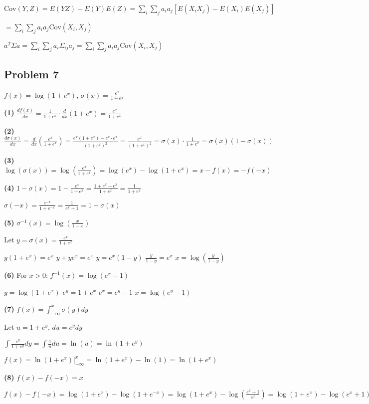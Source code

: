 \documentclass{article}
\begin{document}
$\text{Cov}(Y,Z) = E(YZ) - E(Y)E(Z) = \sum_i \sum_j a_i a_j [E(X_i X_j) - E(X_i)E(X_j)]$

$= \sum_i \sum_j a_i a_j \text{Cov}(X_i, X_j)$

$a^T \Sigma a = \sum_i \sum_j a_i \Sigma_{ij} a_j = \sum_i \sum_j a_i a_j \text{Cov}(X_i, X_j)$

\subsection*{Problem 7}
$f(x) = \log(1 + e^x)$, $\sigma(x) = \frac{e^x}{1 + e^x}$

\textbf{(1)} $\frac{d f(x)}{dx} = \frac{1}{1+e^x} \cdot \frac{d}{dx}(1+e^x) = \frac{e^x}{1+e^x}$

\textbf{(2)} $\frac{d\sigma(x)}{dx} = \frac{d}{dx}\left(\frac{e^x}{1+e^x}\right) = \frac{e^x(1+e^x) - e^x \cdot e^x}{(1+e^x)^2} = \frac{e^x}{(1+e^x)^2} = \sigma(x) \cdot \frac{1}{1+e^x} = \sigma(x)(1-\sigma(x))$

\textbf{(3)} $\log(\sigma(x)) = \log\left(\frac{e^x}{1+e^x}\right) = \log(e^x) - \log(1+e^x) = x - f(x) = -f(-x)$

\textbf{(4)} $1-\sigma(x) = 1 - \frac{e^x}{1+e^x} = \frac{1+e^x-e^x}{1+e^x} = \frac{1}{1+e^x}$

$\sigma(-x) = \frac{e^{-x}}{1+e^{-x}} = \frac{1}{e^x+1} = 1-\sigma(x)$

\textbf{(5)} $\sigma^{-1}(x) = \log\left(\frac{x}{1-x}\right)$

Let $y = \sigma(x) = \frac{e^x}{1+e^x}$

$y(1+e^x) = e^x$
$y + ye^x = e^x$
$y = e^x(1-y)$
$\frac{y}{1-y} = e^x$
$x = \log\left(\frac{y}{1-y}\right)$

\textbf{(6)} For $x > 0$: $f^{-1}(x) = \log(e^x - 1)$

$y = \log(1+e^x)$
$e^y = 1+e^x$
$e^x = e^y - 1$
$x = \log(e^y - 1)$

\textbf{(7)} $f(x) = \int_{-\infty}^x \sigma(y) dy$

Let $u = 1+e^y$, $du = e^y dy$

$\int \frac{e^y}{1+e^y} dy = \int \frac{1}{u} du = \ln(u) = \ln(1+e^y)$

$f(x) = \ln(1+e^x)\Big|_{-\infty}^x = \ln(1+e^x) - \ln(1) = \ln(1+e^x)$

\textbf{(8)} $f(x) - f(-x) = x$

$f(x) - f(-x) = \log(1+e^x) - \log(1+e^{-x}) = \log(1+e^x) - \log\left(\frac{e^x+1}{e^x}\right) = \log(1+e^x) - \log(e^x+1) + x = x$
\end{document}
